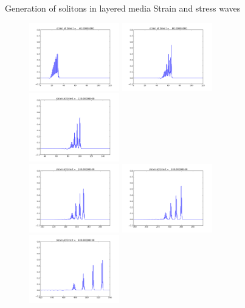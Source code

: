 \documentclass{beamer}
\begin{document}
\begin{frame}{Generation of solitons in layered media}
Strain and stress waves
\begin{figure}
  \includegraphics[width=0.35\textwidth]{frame0004fig1.png}
  \includegraphics[width=0.35\textwidth]{frame0008fig1.png}
  \includegraphics[width=0.35\textwidth]{frame0012fig1.png}\\
  \includegraphics[width=0.35\textwidth]{frame0020fig1.png}
  \includegraphics[width=0.35\textwidth]{frame0030fig1.png}
  \includegraphics[width=0.35\textwidth]{frame0060fig1.png}
\end{figure}
\end{frame}
\end{document}
